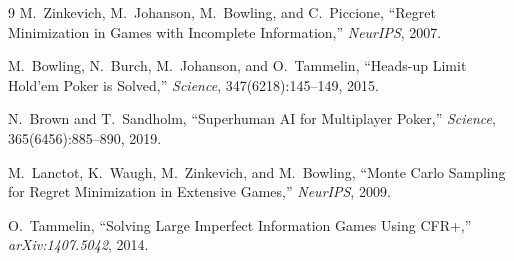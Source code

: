 \documentclass[11pt]{article}
\begin{document}
\begin{thebibliography}{9}
 M.\ Zinkevich, M.\ Johanson, M.\ Bowling, and C.\ Piccione, ``Regret Minimization in Games with Incomplete Information,'' \textit{NeurIPS}, 2007.

 M.\ Bowling, N.\ Burch, M.\ Johanson, and O.\ Tammelin, ``Heads-up Limit Hold'em Poker is Solved,'' \textit{Science}, 347(6218):145--149, 2015.

 N.\ Brown and T.\ Sandholm, ``Superhuman AI for Multiplayer Poker,'' \textit{Science}, 365(6456):885--890, 2019.

 M.\ Lanctot, K.\ Waugh, M.\ Zinkevich, and M.\ Bowling, ``Monte Carlo Sampling for Regret Minimization in Extensive Games,'' \textit{NeurIPS}, 2009.

 O.\ Tammelin, ``Solving Large Imperfect Information Games Using CFR+,'' \textit{arXiv:1407.5042}, 2014.
\end{thebibliography}
\end{document}
